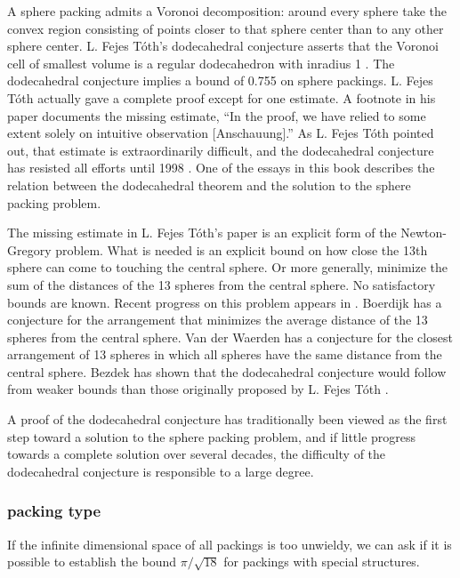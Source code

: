 A sphere packing admits a Voronoi decomposition: around
every sphere take the convex region consisting of points closer to that sphere
center than to any other sphere center.   L. Fejes T\'oth's
dodecahedral
conjecture asserts that the Voronoi cell of smallest volume is
a regular dodecahedron with inradius 1 \cite{Fej42}.
The dodecahedral conjecture implies a bound of 0.755 on sphere
packings.  L. Fejes T\'oth actually gave a complete proof except
for one estimate. A footnote in his paper documents the missing estimate, 
``In the
proof, we have relied to some extent solely on intuitive
observation [Anschauung].''
As L. Fejes T\'oth pointed out, that estimate is extraordinarily
difficult, and the dodecahedral conjecture has resisted all efforts
until 1998 \cite{McL98}. One of the
essays in this book describes the relation between the dodecahedral
theorem and the solution to the sphere packing problem.

The missing estimate in L. Fejes T\'oth's paper is an explicit form
of the Newton-Gregory problem.  What is needed is an explicit bound
on how close the 13th sphere can come to touching the central
sphere.  Or more generally, minimize the sum of the distances
of the 13 spheres from the central sphere.
No satisfactory bounds are known.  Recent progress on this problem appears in
\cite{BoSz03}.  Boerdijk has a conjecture for the arrangement
that minimizes the average distance of the 13 spheres from the
central sphere.
Van der Waerden
has a conjecture for the closest arrangement of 13 spheres in which
all spheres have the same distance from the central sphere.
Bezdek has shown that the dodecahedral conjecture would follow from
weaker bounds than those originally proposed by L. Fejes T\'oth
\cite{Bez97}.

A proof of the dodecahedral conjecture has traditionally been
viewed as the first step toward a solution to the sphere packing problem,
and if little progress towards a complete
solution over several decades, the difficulty of the dodecahedral
conjecture is responsible to a large degree.

\subsubsection{packing type}

If the infinite dimensional space of all packings is too unwieldy,
we can ask if it is possible to establish the bound $\pi/\sqrt{18}$
for packings with special structures.

